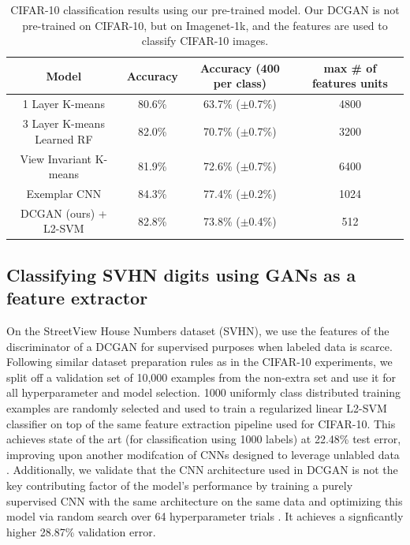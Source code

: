 \documentclass{article} %
\begin{document}
\begin{table}[h]
\caption{CIFAR-10 classification results using our pre-trained model. Our DCGAN is not pre-trained on CIFAR-10, but on Imagenet-1k, and the features are used to classify CIFAR-10 images.}
\begin{center}
\begin{tabular}{ |c|c|c|c| }
    \hline
    \textbf{Model} & Accuracy & Accuracy (400 per class) & max \# of features units\\
    \hline
    1 Layer K-means & 80.6\% & 63.7\% ($\pm$0.7\%) & 4800\\
    3 Layer K-means Learned RF & 82.0\% & 70.7\% ($\pm$0.7\%) & 3200\\
    View Invariant K-means & 81.9\% & 72.6\% ($\pm$0.7\%) & 6400\\
    Exemplar CNN & 84.3\% & 77.4\% ($\pm$0.2\%) & 1024\\
    \hline
    DCGAN (ours) + L2-SVM & 82.8\% & 73.8\% ($\pm$0.4\%) & 512\\
    \hline
\end{tabular}
\end{center}
\label{tab:cifar10_results}
\end{table}

\subsection{Classifying SVHN digits using GANs as a feature extractor}

On the StreetView House Numbers dataset (SVHN)\citep{netzer2011reading}, we use the features of the discriminator of a DCGAN for supervised purposes when labeled data is scarce. Following similar dataset preparation rules as in the CIFAR-10 experiments, we split off a validation set of 10,000 examples from the non-extra set and use it for all hyperparameter and model selection. 1000 uniformly class distributed training examples are randomly selected and used to train a regularized linear L2-SVM classifier on top of the same feature extraction pipeline used for CIFAR-10. This achieves state of the art (for classification using 1000 labels) at 22.48\% test error, improving upon another modifcation of CNNs designed to leverage unlabled data \citep{zhao2015stacked}. Additionally, we validate that the CNN architecture used in DCGAN is not the key contributing factor of the model's performance by training a purely supervised CNN with the same architecture on the same data and optimizing this model via random search over 64 hyperparameter trials \citep{bergstra2012hpopt}. It achieves a signficantly higher 28.87\% validation error.
\end{document}
